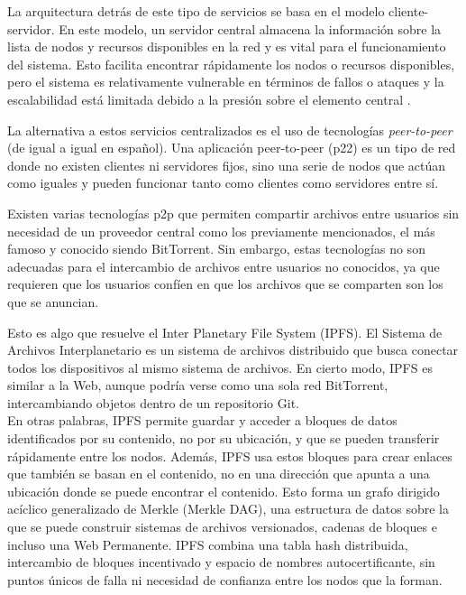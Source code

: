 La arquitectura detrás de este tipo de servicios se basa en el modelo cliente-servidor. En este modelo,
un servidor central almacena la información sobre la lista de nodos y recursos disponibles en la red y es vital para el
funcionamiento del sistema. Esto facilita encontrar rápidamente los nodos o recursos disponibles, pero el sistema es relativamente
vulnerable en términos de fallos o ataques y la escalabilidad está limitada debido a la presión sobre el elemento central \cite{vybochPeertopeerProtocolsFile2017}.

La alternativa a estos servicios centralizados es el uso de tecnologías \textit{peer-to-peer} (de igual a igual en español).
Una aplicación peer-to-peer (p22) es un tipo de red donde no existen clientes ni servidores fijos,
sino una serie de nodos que actúan como iguales y pueden funcionar tanto como clientes como servidores entre sí.

Existen varias tecnologías p2p que permiten compartir archivos entre usuarios sin necesidad de un proveedor central como los previamente mencionados, el
más famoso y conocido siendo BitTorrent\cite{BitTorrentProtocol}. Sin embargo, estas tecnologías no son adecuadas para el intercambio de archivos entre
usuarios no conocidos, ya que requieren que los usuarios confíen en que los archivos que se comparten son los que se anuncian.

Esto es algo que resuelve el Inter Planetary File System (IPFS).
El Sistema de Archivos Interplanetario es un sistema de archivos distribuido que busca conectar todos los dispositivos
al mismo sistema de archivos. En cierto modo, IPFS es similar a la Web, aunque podría verse como una sola red
BitTorrent, intercambiando objetos dentro de un repositorio Git.
\\En otras palabras, IPFS permite guardar y acceder a bloques de
datos identificados por su contenido, no por su ubicación, y que se pueden transferir rápidamente entre los nodos. Además, IPFS
usa estos bloques para crear enlaces que también se basan en el contenido, no en una dirección que apunta a una ubicación donde se puede encontrar el contenido.
Esto forma un grafo dirigido acíclico generalizado de Merkle (Merkle DAG), una estructura de datos sobre la que se puede
construir sistemas de archivos versionados, cadenas de bloques e incluso una Web Permanente. IPFS combina una tabla hash
distribuida, intercambio de bloques incentivado y espacio de nombres autocertificante, sin puntos únicos de falla ni necesidad
de confianza entre los nodos que la forman\cite{benetIPFSContentAddressed2014}.


